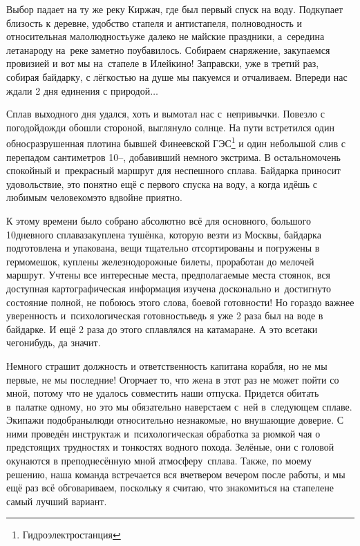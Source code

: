 \newpage
Выбор падает на ту же реку Киржач, где был первый спуск на воду. Подкупает близость к деревне, удобство стапеля и антистапеля, полноводность и относительная малолюдность\mdash уже далеко не майские праздники, а~середина лета\mdash народу на~реке заметно поубавилось. Собираем снаряжение, закупаемся провизией и вот мы на~стапеле в Илейкино! Заправски, уже в третий раз, собирая байдарку, с лёгкостью на душе мы пакуемся и отчаливаем. Впереди нас ждали 2 дня единения с природой$\ldots$

\renewcommand*{\thefootnote}{\fnsymbol{footnote}}
Сплав выходного дня удался, хоть и вымотал нас с~непривычки. Повезло с погодой\mdash дожди обошли стороной, выглянуло солнце. На пути встретился один обнос\mdash разрушенная плотина бывшей Финеевской ГЭС\footnote[1]{Гидроэлектростанция} и один небольшой слив с перепадом сантиметров 10\thinspace\nobreakdash--, добавивший немного экстрима. В остальном\mdash очень спокойный и~прекрасный маршрут для неспешного сплава. Байдарка приносит удовольствие, это понятно ещё с первого спуска на воду, а когда идёшь с любимым человеком\mdash это вдвойне приятно.

К этому времени было собрано абсолютно всё для основного, большого 10\sdash дневного сплава\mdash закуплена тушёнка, которую везти из Москвы, байдарка подготовлена и упакована, вещи тщательно отсортированы и погружены в гермомешок, куплены железнодорожные билеты, проработан до мелочей маршрут. Учтены все интересные места, предполагаемые места стоянок, вся доступная картографическая информация изучена досконально и~достигнуто состояние полной, не побоюсь этого слова, боевой готовности! Но гораздо  важнее уверенность и~психологическая готовность\mdash ведь я уже 2 раза был на воде в байдарке. И ещё 2 раза до этого сплавлялся на катамаране. А это все\sdash таки чего\sdash нибудь, да значит.

Немного страшит должность и ответственность капитана корабля, но не мы первые, не мы последние! Огорчает то, что жена в этот раз не может пойти со мной, потому что не удалось совместить наши отпуска. Придется обитать в~палатке одному, но это мы обязательно наверстаем с~ней в~следующем сплаве.
Экипажи подобраны\mdash люди относительно незнакомые, но внушающие доверие. С ними проведён инструктаж и~психологическая обработка за рюмкой чая о предстоящих трудностях и тонкостях водного похода. Зелёные, они с головой окунаются в преподнесённую мной атмосферу~сплава. Также, по моему решению, наша команда встречается вся вчетвером вечером после работы, и мы ещё раз всё обговариваем, поскольку я считаю, что знакомиться на стапеле\mdash не самый лучший вариант.

